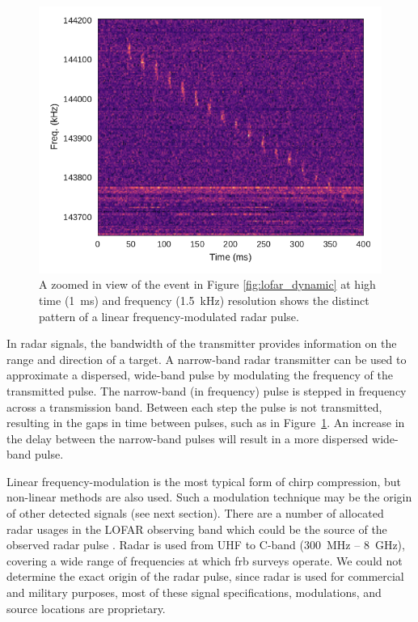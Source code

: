 \documentclass[a4paper,fleqn,usenatbib]{mnras}
\begin{document}
\begin{figure}
    \includegraphics[width=1.0\linewidth]{figures/LOFAR_dynamic_high_res.pdf}
    \caption{A zoomed in view of the event in Figure \ref{fig:lofar_dynamic} at
    high time (1~ms) and frequency (1.5~kHz) resolution shows the distinct
    pattern of a linear frequency-modulated radar pulse.
    }
    \label{fig:lofar_dynamic_high}
\end{figure}

In radar signals, the bandwidth of the transmitter provides information on the
range and direction of a target. A narrow-band radar transmitter can be used to
approximate a dispersed, wide-band pulse by modulating the frequency of the
transmitted pulse. The narrow-band (in frequency) pulse is stepped in frequency
across a transmission band. Between each step the pulse is not transmitted,
resulting in the gaps in time between pulses, such as in
Figure~\ref{fig:lofar_dynamic_high}.  An increase in the delay between the
narrow-band pulses will result in a more dispersed wide-band pulse.

Linear frequency-modulation is the most typical form of chirp compression, but
non-linear methods are also used. Such a modulation technique may be the origin
of other detected signals (see next section).  There are a number of allocated
radar usages in the LOFAR observing band which could be the source of the
observed radar pulse \citep{ofcom2017}.  Radar is used from UHF to C-band
(300~MHz -- 8~GHz), covering a wide range of frequencies at which \gls{frb}
surveys operate. We could not determine the exact origin of the radar pulse,
since radar is used for commercial and military purposes, most of these signal
specifications, modulations, and source locations are proprietary.
\end{document}
